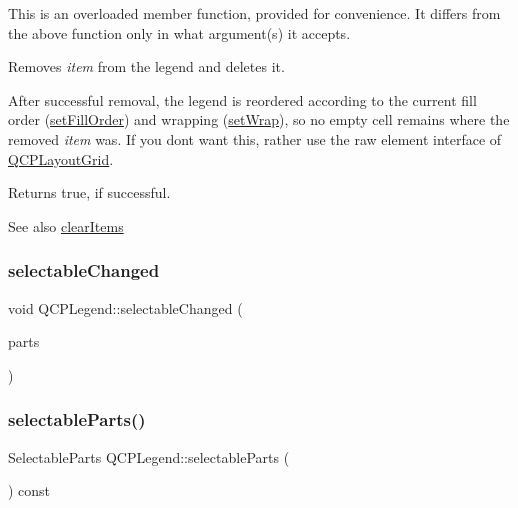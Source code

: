 This is an overloaded member function, provided for convenience. It differs from the above function only in what argument(s) it accepts.

Removes {\itshape item} from the legend and deletes it.

After successful removal, the legend is reordered according to the current fill order (\mbox{\hyperlink{class_q_c_p_layout_grid_affc2f3cfd22f28698c5b29b960d2a391}{set\+Fill\+Order}}) and wrapping (\mbox{\hyperlink{class_q_c_p_layout_grid_ab36af18d77e4428386d02970382ee598}{set\+Wrap}}), so no empty cell remains where the removed {\itshape item} was. If you don\textquotesingle{}t want this, rather use the raw element interface of \mbox{\hyperlink{class_q_c_p_layout_grid}{Q\+C\+P\+Layout\+Grid}}.

Returns true, if successful.

\begin{DoxySeeAlso}{See also}
\mbox{\hyperlink{class_q_c_p_legend_a24795c7250eb5214fcea16b7217b4dfb}{clear\+Items}} 
\end{DoxySeeAlso}
\mbox{\label{class_q_c_p_legend_a8a77300fd0976d6bdd8000f4e8d114b8}} 
\subsubsection{\texorpdfstring{selectableChanged}{selectableChanged}}
{\footnotesize\ttfamily void Q\+C\+P\+Legend\+::selectable\+Changed (\begin{DoxyParamCaption}\item[{Q\+C\+P\+Legend\+::\+Selectable\+Parts}]{parts }\end{DoxyParamCaption})\hspace{0.3cm}{\ttfamily [signal]}}

\mbox{\label{class_q_c_p_legend_ad091ff5e11edbe0adecba81c35522ac7}} 
\subsubsection{\texorpdfstring{selectableParts()}{selectableParts()}}
{\footnotesize\ttfamily Selectable\+Parts Q\+C\+P\+Legend\+::selectable\+Parts (\begin{DoxyParamCaption}{ }\end{DoxyParamCaption}) const\hspace{0.3cm}{\ttfamily [inline]}}

